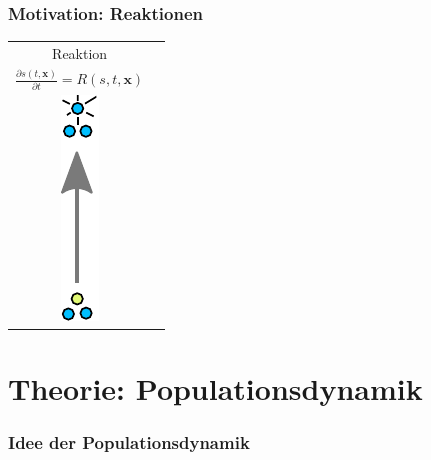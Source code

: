 \documentclass[aspectratio=32]{beamer}
\newcommand{\sectionframe}{\begin{frame}
	\begin{center}
		\textcolor{simtechred}{\Large\insertsection}
	\end{center}
\end{frame}}
\begin{document}
\begin{frame}
\frametitle{Motivation: Reaktionen}

\begin{center}
\begin{tabular}{ c c }
	Reaktion \\
	\(
		\frac{\partial s(t,\bm{x})}{\partial t} = R(s,t,\bm{x})
	\)
	\\
  \includegraphics[height=\textwidth/3,keepaspectratio,angle=-90,origin=c]{Bilder/reaction.pdf}
	\\
\end{tabular}
\end{center}

\end{frame}

\section{Theorie: Populationsdynamik}
\sectionframe

\begin{frame}
\frametitle{Idee der Populationsdynamik}

\end{frame}
\end{document}

